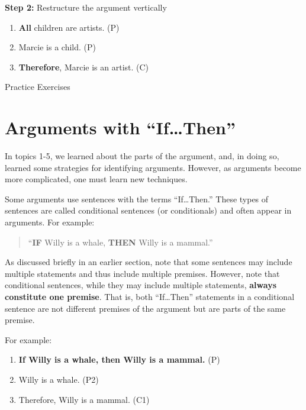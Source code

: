 \documentclass[
]{book}
\providecommand{\tightlist}{%
  \setlength{\itemsep}{0pt}\setlength{\parskip}{0pt}}
\begin{document}
\begin{reflect}
\textbf{Step 2:} Restructure the argument vertically

\begin{enumerate}
\def\labelenumi{\arabic{enumi}.}
\tightlist
\item
  \textbf{All} children are artists. (P)
\item
  Marcie is a child. (P)
\item
  \textbf{Therefore}, Marcie is an artist. (C)
\end{enumerate}

{Practice Exercises}
\end{reflect}

\hypertarget{arguments-with-ifthen}{%
\section{Arguments with ``If\ldots Then''}\label{arguments-with-ifthen}}

In topics 1-5, we learned about the parts of the argument, and, in doing so, learned some strategies for identifying arguments. However, as arguments become more complicated, one must learn new techniques.

Some arguments use sentences with the terms ``If\ldots Then.'' These types of sentences are called conditional sentences (or conditionals) and often appear in arguments. For example:

\begin{quote}
``\textbf{IF} Willy is a whale, \textbf{THEN} Willy is a mammal.''
\end{quote}

As discussed briefly in an earlier section, note that some sentences may include multiple statements and thus include multiple premises. However, note that conditional sentences, while they may include multiple statements, \textbf{always constitute one premise}. That is, both ``If\ldots Then'' statements in a conditional sentence are not different premises of the argument but are parts of the same premise.

For example:

\begin{enumerate}
\def\labelenumi{\arabic{enumi}.}
\tightlist
\item
  \textbf{If Willy is a whale, then Willy is a mammal.} (P)\\
\item
  Willy is a whale. (P2)\\
\item
  Therefore, Willy is a mammal. (C1)
\end{enumerate}
\end{document}
